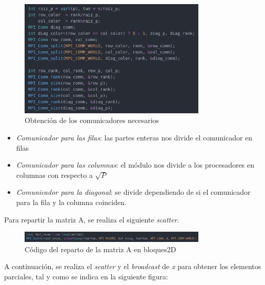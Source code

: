 \begin{figure}[H]
\centering
\includegraphics[width=0.8\textwidth]{imagenes/colores.png}
\caption{Obtención de los comunicadores necesarios}
\end{figure}

\begin{itemize}
\item \textit{Comunicador para las filas}: las partes enteras nos divide el comunicador en filas
\item \textit{Comunicador para las columnas}: el módulo nos divide a los procesadores en columnas con respecto a $\sqrt{P}$
\item \textit{Comunicador para la diagonal}: se divide dependiendo de si el comunicador para la fila y la columna coinciden.
\end{itemize}

Para repartir la matriz A, se realiza el siguiente \textit{scatter}.

\begin{figure}[H]
\centering
\includegraphics[width=0.8\textwidth]{imagenes/scatter-a.png}
\caption{Código del reparto de la matriz A en bloques2D}
\end{figure}

A continuación, se realiza el \textit{scatter} y el \textit{broadcast} de \textit{x} para obtener los elementos parciales, tal y como se indica en la siguiente figura:

